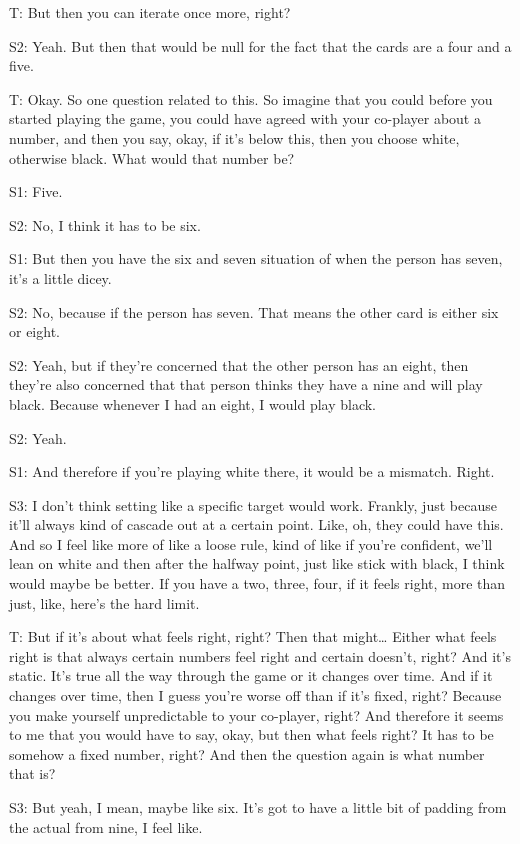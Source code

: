 \documentclass[a4paper,superscriptaddress,nofootinbib]{revtex4}
\begin{document}
T: But then you can iterate once more, right? 

S2: Yeah. But then that would be null for the fact that the cards are a four and a five. 

T: Okay. So one question related to this. So imagine that you could before you started playing the game, you could have agreed with your co-player about a number, and then you say, okay, if it's below this, then you choose white, otherwise black. What would that number be? 

S1: Five. 

S2: No, I think it has to be six.

S1: But then you have the six and seven situation of when the person has seven, it's a little dicey.

S2: No, because if the person has seven. That means the other card is either six or eight. 

S2: Yeah, but if they're concerned that the other person has an eight, then they're also concerned that that person thinks they have a nine and will play black. Because whenever I had an eight, I would play black. 

S2: Yeah.

S1: And therefore if you're playing white there, it would be a mismatch. Right. 

S3: I don't think setting like a specific target would work. Frankly, just because it'll always kind of cascade out at a certain point. Like, oh, they could have this. And so I feel like more of like a loose rule, kind of like if you're confident, we'll lean on white and then after the halfway point, just like stick with black, I think would maybe be better. If you have a two, three, four, if it feels right, more than just, like, here's the hard limit. 

T: But if it's about what feels right, right? Then that might… Either what feels right is that always certain numbers feel right and certain doesn’t, right? And it's static. It's true all the way through the game or it changes over time. And if it changes over time, then I guess you're worse off than if it's fixed, right? Because you make yourself unpredictable to your co-player, right? And therefore it seems to me that you would have to say, okay, but then what feels right? It has to be somehow a fixed number, right? And then the question again is what number that is?

S3: But yeah, I mean, maybe like six. It's got to have a little bit of padding from the actual from nine, I feel like. 
\end{document}
